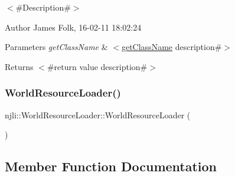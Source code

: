 $<$\#\+Description\#$>$ 

\begin{DoxyAuthor}{Author}
James Folk, 16-\/02-\/11 18\+:02\+:24
\end{DoxyAuthor}

\begin{DoxyParams}{Parameters}
{\em get\+Class\+Name} & $<$\mbox{\hyperlink{classnjli_1_1_world_resource_loader_ab568027aba2b36f2bdf12db437b5500a}{get\+Class\+Name}} description\#$>$\\
\hline
\end{DoxyParams}
\begin{DoxyReturn}{Returns}
$<$\#return value description\#$>$ 
\end{DoxyReturn}
\mbox{\label{classnjli_1_1_world_resource_loader_aca0a853c5159760d6d37cad0bbad7363}} 
\subsubsection{\texorpdfstring{World\+Resource\+Loader()}{WorldResourceLoader()}\hspace{0.1cm}{\footnotesize\ttfamily [2/2]}}
{\footnotesize\ttfamily njli\+::\+World\+Resource\+Loader\+::\+World\+Resource\+Loader (\begin{DoxyParamCaption}\item[{const \mbox{\hyperlink{classnjli_1_1_world_resource_loader}{World\+Resource\+Loader}} \&}]{ }\end{DoxyParamCaption})\hspace{0.3cm}{\ttfamily [private]}}



\subsection{Member Function Documentation}
\mbox{\label{classnjli_1_1_world_resource_loader_afbb6af85a0262734c5fd0b78461bde82}} 
